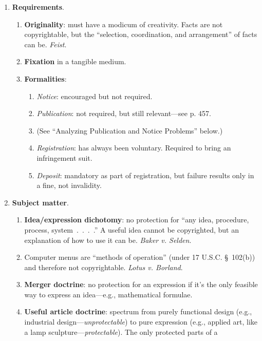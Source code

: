 \begin{enumerate}
    \item \textbf{Requirements}.
    \begin{enumerate}
        \item \textbf{Originality}: must have a modicum of creativity. Facts 
        are not copyrightable, but the ``selection, coordination, and 
        arrangement'' of facts can be. \emph{Feist}.
        \item \textbf{Fixation} in a tangible medium.
        \item \textbf{Formalities}:
        \begin{enumerate}
            \item \emph{Notice}: encouraged but not required.
            \item \emph{Publication}: not required, but still relevant---see 
            p. 457.
            \item (See ``Analyzing Publication and Notice Problems'' below.)
            \item \emph{Registration}: has always been voluntary. Required to 
            bring an infringement suit.
            \item \emph{Deposit}: mandatory as part of registration, but 
            failure results only in a fine, not invalidity.
        \end{enumerate}
    \end{enumerate}
    \item \textbf{Subject matter}.
    \begin{enumerate}
        \item \textbf{Idea/expression dichotomy}: no protection for ``any 
        idea, procedure, process, system~.~.~.~.'' A useful idea cannot be 
        copyrighted, but an explanation of how to use it can be. \emph{Baker 
        v. Selden}.
        \item Computer menus are ``methods of operation'' (under 17 U.S.C. \S\ 
        102(b)) and therefore not copyrightable. \emph{Lotus v. Borland}.
        \item \textbf{Merger doctrine}: no protection for an expression if 
        it's the only feasible way to express an idea---e.g., mathematical 
        formulae.
        \item \textbf{Useful article doctrine}: spectrum from purely 
        functional design (e.g., industrial design---\emph{unprotectable}) to 
        pure expression (e.g., applied art, like a lamp 
        sculpture---\emph{protectable}). The only protected parts of a 

\end{enumerate}
\end{enumerate}

